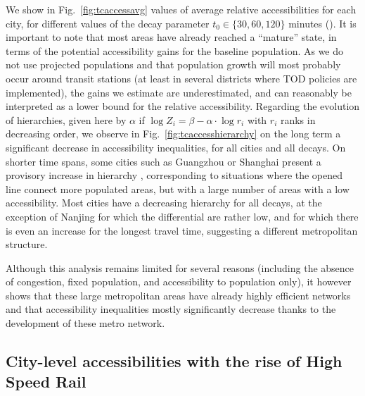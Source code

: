 We show in Fig.~\ref{fig:tcaccessavg} values of average relative accessibilities for each city, for different values of the decay parameter $t_0 \in \{30,60,120\}$ minutes (). It is important to note that most areas have already reached a ``mature'' state, in terms of the potential accessibility gains for the baseline population. As we do not use projected populations and that population growth will most probably occur around transit stations (at least in several districts where TOD policies are implemented), the gains we estimate are underestimated, and can reasonably be interpreted as a lower bound for the relative accessibility. Regarding the evolution of hierarchies, given here by $\alpha$ if $\log Z_i = \beta - \alpha \cdot \log r_i$ with $r_i$ ranks in decreasing order, we observe in Fig.~\ref{fig:tcaccesshierarchy} on the long term a significant decrease in accessibility inequalities, for all cities and all decays. On shorter time spans, some cities such as Guangzhou or Shanghai present a provisory increase in hierarchy , corresponding to situations where the opened line connect more populated areas, but with a large number of areas with a low accessibility. Most cities have a decreasing hierarchy for all decays, at the exception of Nanjing for which the differential are rather low, and for which there is even an increase for the longest travel time, suggesting a different metropolitan structure.

Although this analysis remains limited for several reasons (including the absence of congestion, fixed population, and accessibility to population only), it however shows that these large metropolitan areas have already highly efficient networks and that accessibility inequalities  mostly significantly decrease thanks to the development of these metro network.





\subsection{City-level accessibilities with the rise of High Speed Rail}

